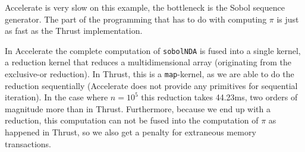 \documentclass[preprint]{sigplanconf}
\begin{document}



Accelerate is very slow on this example, the bottleneck is the Sobol
sequence generator. The part of the programming that has to do with
computing $\pi$ is just as fast as the Thrust implementation. 

In Accelerate the complete computation of \verb|sobolNDA| is fused
into a single kernel, a reduction kernel that reduces a
multidimensional array (originating from the exclusive-or
reduction). In Thrust, this is a \verb|map|-kernel, as we are able to
do the reduction sequentially (Accelerate does not provide any
primitives for sequential iteration). In the case where $n=10^5$ this
reduction takes 44.23ms, two orders of magnitude more than in
Thrust. Furthermore, because we end up with a reduction, this
computation can not be fused into the computation of $\pi$ as happened
in Thrust, so we also get a penalty for extraneous memory
transactions.
\end{document}

